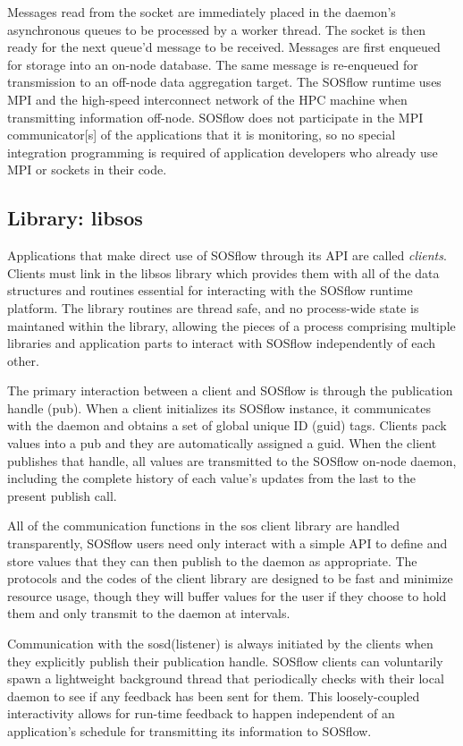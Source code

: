 %
Messages read from the socket are immediately placed in the daemon's
asynchronous queues to be processed by a worker thread.
%
The socket is then ready for the next queue'd message to
be received.
%
Messages are first enqueued for storage into an on-node database.
%
The same message is re-enqueued for transmission to an off-node data
aggregation target.
%
The SOSflow runtime uses MPI and the high-speed interconnect network
of the HPC machine when transmitting information off-node.
%
SOSflow does not participate in the MPI communicator[s] of the
applications that it is monitoring, so no special integration
programming is required of application developers who already use MPI
or sockets in their code.
%
\par
%
%
\subsection{Library: libsos} %
%
Applications that make direct use of SOSflow through its API are called
\textit{clients}.
%
Clients must link in the libsos library which provides them with all of
the data structures and routines essential for interacting with
the SOSflow runtime platform.
%
The library routines are thread safe, and no process-wide state is
maintaned within the library, allowing the pieces of a process
comprising multiple libraries and application parts to interact with
SOSflow independently of each other.
%
\par
The primary interaction between a client and SOSflow is through the
publication handle (pub).
%
When a client initializes its SOSflow instance, it communicates with the
daemon and obtains a set of global unique ID (guid) tags.
%
Clients pack values into a pub and they are automatically assigned a guid.
%
When the client publishes that handle, all values are transmitted to
the SOSflow on-node daemon, including the complete history of each
value's updates from the last to the present publish call.
%
\par
%
All of the communication functions in the sos client library are
handled transparently, SOSflow users need only interact with a simple API
to define and store values that they can then publish to the daemon
as appropriate.
%
The protocols and the codes of the client library are designed to be
fast and minimize resource usage, though they will buffer values for
the user if they choose to hold them and only transmit to the daemon
at intervals.
%
\par
%
Communication with the sosd(listener) is always initiated by the
clients when they explicitly publish their publication handle.
%
SOSflow clients can voluntarily spawn a lightweight background thread
that periodically checks with their local daemon to see if any
feedback has been sent for them.
%
This loosely-coupled interactivity allows for run-time feedback to
happen independent of an application's schedule for transmitting its
information to SOSflow.
%
%

